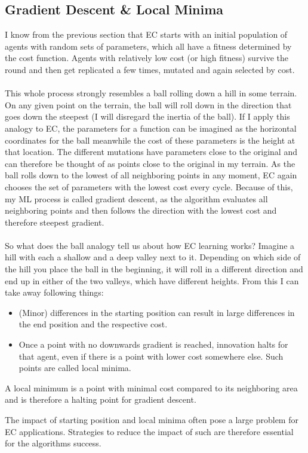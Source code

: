 \documentclass[11pt]{report}
\newcommand{\mydeflabel}{}
\newenvironment{mydef}[1]
{\renewcommand\mydeflabel{#1}\begin{mydefinner}}
{\end{mydefinner}}
\begin{document}
    \subsection{Gradient Descent \& Local Minima}\label{subsec:gradient-descent}
    I know from the previous section that EC starts with an initial population of agents with random sets of parameters, which all have a fitness determined by the cost function.
    Agents with relatively low cost (or high fitness) survive the round and then get replicated a few times, mutated and again selected by cost.
    \\ \\
    This whole process strongly resembles a ball rolling down a hill in some terrain.
    On any given point on the terrain, the ball will roll down in the direction that goes down the steepest (I will disregard the inertia of the ball).
    If I apply this analogy to EC, the parameters for a function can be imagined as the horizontal coordinates for the ball meanwhile the cost of these parameters is the height at that location.
    The different mutations have parameters close to the original and can therefore be thought of as points close to the original in my terrain.
    As the ball rolls down to the lowest of all neighboring points in any moment, EC again chooses the set of parameters with the lowest cost every cycle.
    Because of this, my ML process is called gradient descent, as the algorithm evaluates all neighboring points and then follows the direction with the lowest cost and therefore steepest gradient.
    \\ \\
    So what does the ball analogy tell us about how EC learning works?
    Imagine a hill with each a shallow and a deep valley next to it.
    Depending on which side of the hill you place the ball in the beginning, it will roll in a different direction and end up in either of the two valleys, which have different heights.
    From this I can take away following things:
    \begin{itemize}
        \item (Minor) differences in the starting position can result in large differences in the end position and the respective cost.
        \item Once a point with no downwards gradient is reached, innovation halts for that agent, even if there is a point with lower cost somewhere else.
        Such points are called local minima.
    \end{itemize}
    \begin{mydef}{Local Minimum}
        A local minimum is a point with minimal cost compared to its neighboring area and is therefore a halting point for gradient descent.
    \end{mydef}
    The impact of starting position and local minima often pose a large problem for EC applications.
    Strategies to reduce the impact of such are therefore essential for the algorithms success.
\end{document}
